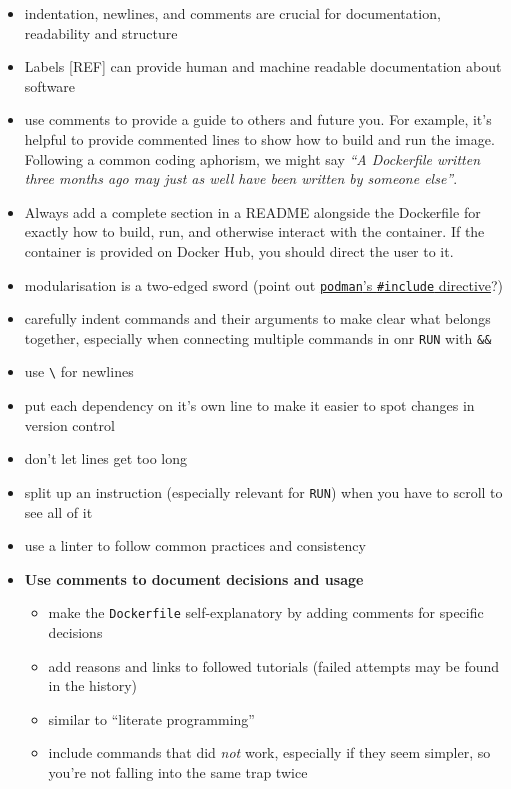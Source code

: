 \documentclass[10pt,letterpaper]{article}
\providecommand{\tightlist}{%
  \setlength{\itemsep}{0pt}\setlength{\parskip}{0pt}}
\begin{document}
\begin{itemize}
\tightlist
\item
  indentation, newlines, and comments are crucial for documentation,
  readability and structure
\item
  Labels {[}REF{]} can provide human and machine readable documentation
  about software
\item
  use comments to provide a guide to others and future you. For example,
  it's helpful to provide commented lines to show how to build and run
  the image. Following a common coding aphorism, we might say \emph{``A
  Dockerfile written three months ago may just as well have been written
  by someone else''}.
\item
  Always add a complete section in a README alongside the Dockerfile for
  exactly how to build, run, and otherwise interact with the container.
  If the container is provided on Docker Hub, you should direct the user
  to it.
\item
  modularisation is a two-edged sword (point out
  \href{https://www.mankier.com/1/podman-build}{\texttt{podman}'s
  \texttt{\#include} directive}?) 
\item
  carefully indent commands and their arguments to make clear what
  belongs together, especially when connecting multiple commands in onr
  \texttt{RUN} with \texttt{\&\&}
\item
  use \texttt{\textbackslash{}} for newlines
\item
  put each dependency on it's own line to make it easier to spot changes
  in version control
\item
  don't let lines get too long
\item
  split up an instruction (especially relevant for \texttt{RUN}) when
  you have to scroll to see all of it
\item
  use a linter to follow common practices and consistency 
\item
  \textbf{Use comments to document decisions and usage}

  \begin{itemize}
  \tightlist
  \item
    make the \texttt{Dockerfile} self-explanatory by adding comments for
    specific decisions
  \item
    add reasons and links to followed tutorials (failed attempts may be
    found in the history)
  \item
    similar to ``literate programming''
  \item
    include commands that did \emph{not} work, especially if they seem
    simpler, so you're not falling into the same trap twice
  \end{itemize}
\end{itemize}
\end{document}
